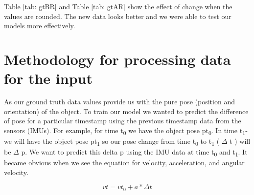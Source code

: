 \begin{table}[]
\centering
{}
\caption{Sample ground truth data after rounding up}
\label{tab: gtAR}
\end{table}


Table \ref{tab: gtBR} and Table \ref{tab: gtAR} show the effect of change when the values are rounded. The new data looks better and we were able to test our models more effectively.





\section{Methodology for processing data for the input}

As our ground truth data values provide us with the pure pose (position and orientation) of the object. To train our model we wanted to predict the difference of pose for a particular timestamp using the previous timestamp data from the sensors (IMUs). For example, for time t\textsubscript{0} we have the object pose pt\textsubscript{0}. In time t\textsubscript{1}­­­ we will have the object pose pt\textsubscript{1} so our pose change from time t\textsubscript{0} to t\textsubscript{1} ( $\Delta$ t ) will be $\Delta$ p.
We want to predict this delta p using the IMU data at time t\textsubscript{0} and t\textsubscript{1}.  It became obvious when we see the equation for velocity, acceleration, and angular velocity.

\begin{equation}
vt = vt_{0}  + a* \Delta t  \label{eq:6.1}
\end{equation}

